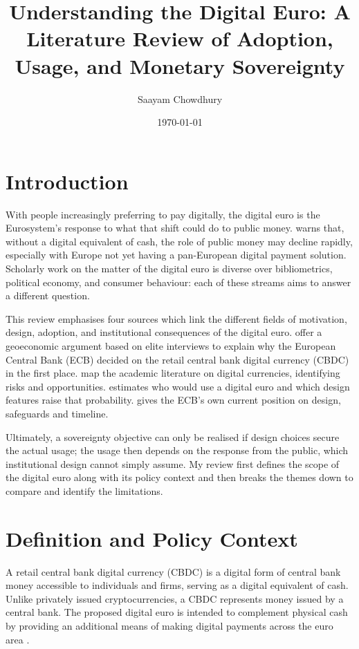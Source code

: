 \documentclass[10pt,a4paper,twocolumn]{article}
\title{Understanding the Digital Euro: A Literature Review of Adoption, Usage, and Monetary Sovereignty}
\author{Saayam Chowdhury}
\date{\today}
\makeatletter
\renewcommand{\maketitle}{%
  \twocolumn[%
    \begin{@twocolumnfalse}
      \vspace*{-0.5cm}
      {\color{accent}\rule{\textwidth}{1.2pt}}\par\vspace{0.6cm}
      \begin{center}
        {\Large\bfseries\color{accent} \@title \par}
        \vspace{0.6cm}
        {\large \@author \par}
        \vspace{0.3cm}
        {\small\color{softgray} \@date \par}
      \end{center}
      \vspace{0.2cm}
      {\color{accent}\rule{\textwidth}{0.4pt}}\par\vspace{0.4cm}
      \begin{abstract}
        
      \end{abstract}
      \vspace{0.2cm}
      \noindent\textbf{\color{accent}Keywords:} \@keywords\par
      \vspace{0.2cm}
      {\color{accent}\rule{\textwidth}{0.4pt}}\par\vspace{0.6cm}
    \end{@twocolumnfalse}
  ]%
}
\makeatother
\begin{document}
\maketitle

\section{Introduction}

With people increasingly preferring to pay digitally, the digital euro is the Eurosystem's response to what that shift could do to public money. \textcite{Cipollone2026a} warns that, without a digital equivalent of cash, the role of public money may decline rapidly, especially with Europe not yet having a pan-European digital payment solution. Scholarly work on the matter of the digital euro is diverse over bibliometrics, political economy, and consumer behaviour: each of these streams aims to answer a different question.

This review emphasises four sources which link the different fields of motivation, design, adoption, and institutional consequences of the digital euro. \textcite{Quaglia2025} offer a geoeconomic argument based on elite interviews to explain why the European Central Bank (ECB) decided on the retail central bank digital currency (CBDC) in the first place. \textcite{Cotugno2024} map the academic literature on digital currencies, identifying risks and opportunities. \textcite{Seiler2026} estimates who would use a digital euro and which design features raise that probability. \textcite{Cipollone2026a} gives the ECB's own current position on design, safeguards and timeline.

Ultimately, a sovereignty objective can only be realised if design choices secure the actual usage; the usage then depends on the response from the public, which institutional design cannot simply assume. My review first defines the scope of the digital euro along with its policy context and then breaks the themes down to compare and identify the limitations.

\section{Definition and Policy Context}

A retail central bank digital currency (CBDC) is a digital form of central bank money accessible to individuals and firms, serving as a digital equivalent of cash. Unlike privately issued cryptocurrencies, a CBDC represents money issued by a central bank. The proposed digital euro is intended to complement physical cash by providing an additional means of making digital payments across the euro area \parencite{Cipollone2026a}.
\end{document}
